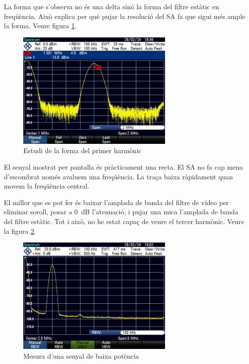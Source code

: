 \documentclass[catalan, a4paper, nobib]{tufte-handout}
\begin{document}
\newpage

 La forma que s'observa no és una delta sinó la forma del filtre estàtic en freqüència. Això explica per què pujar la resolució del SA fa que sigui més ample la forma. Veure figura \ref{fig:q2}.

\begin{figure}
    \begin{center}
        \includegraphics[width=292px]{q2_2.png}
        \caption{Estudi de la forma del primer harmònic}
        \label{fig:q2}
    \end{center}
\end{figure}

 El senyal mostrat per pantalla és pràcticament una recta. El SA no fa cap mena d'escombrat només avaluem una freqüència. La traça baixa ràpidament quan movem la freqüència central.

 El millor que es pot fer és baixar l'amplada de banda del filtre de vídeo per eliminar soroll, posar a \qty{0}{\deci\bel} l'atenuació, i pujar una mica l'amplada de banda del filtre estàtic. Tot i això, no he estat capaç de veure el tercer harmònic. Veure la figura \ref{fig:q3}.

\begin{figure}
    \begin{center}
        \includegraphics[width=292px]{q3.png}
        \caption{Mesura d'una senyal de baixa potència}
        \label{fig:q3}
    \end{center}
\end{figure}
\end{document}
